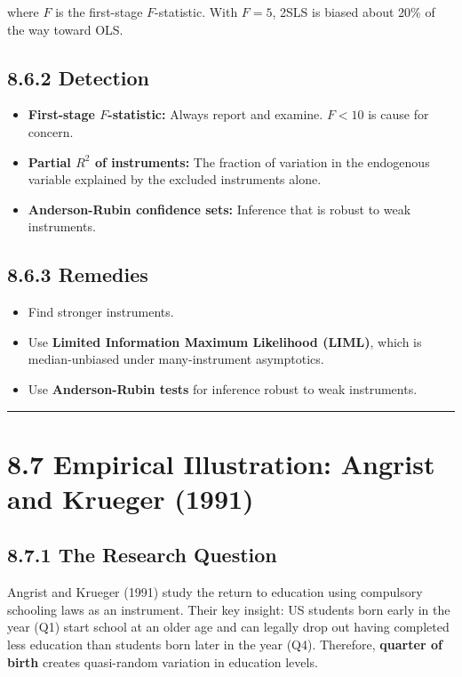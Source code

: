 where $F$ is the first-stage $F$-statistic. With $F = 5$, 2SLS is biased about 20\% of the way toward OLS.

\subsection{8.6.2 Detection}

\begin{itemize}
\item \textbf{First-stage $F$-statistic:} Always report and examine. $F < 10$ is cause for concern.
\item \textbf{Partial $R^2$ of instruments:} The fraction of variation in the endogenous variable explained by the excluded instruments alone.
\item \textbf{Anderson-Rubin confidence sets:} Inference that is robust to weak instruments.
\end{itemize}

\subsection{8.6.3 Remedies}

\begin{itemize}
\item Find stronger instruments.
\item Use \textbf{Limited Information Maximum Likelihood (LIML)}, which is median-unbiased under many-instrument asymptotics.
\item Use \textbf{Anderson-Rubin tests} for inference robust to weak instruments.
\end{itemize}

\medskip\hrule\medskip

\section{8.7 Empirical Illustration: Angrist and Krueger (1991)}

\subsection{8.7.1 The Research Question}

Angrist and Krueger (1991) study the return to education using compulsory schooling laws as an instrument. Their key insight: US students born early in the year (Q1) start school at an older age and can legally drop out having completed less education than students born later in the year (Q4). Therefore, \textbf{quarter of birth} creates quasi-random variation in education levels.


